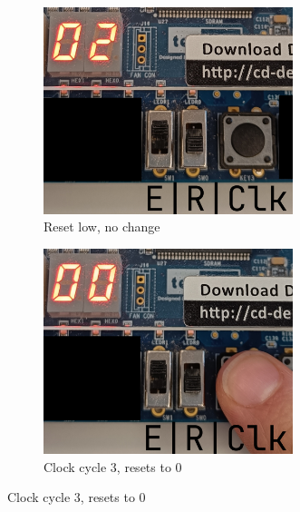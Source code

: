 \documentclass{article}
\begin{document}
\begin{figure}[h]
    \begin{subfigure}[t]{0.45\textwidth}
        \centering
        \includegraphics[width=0.8\textwidth]{Figures/Part1_5.jpg}
        \caption{Reset low, no change}
        \label{fig:p1_5}
    \end{subfigure}
    \hfill
    \begin{subfigure}[t]{0.45\textwidth}
        \centering
        \includegraphics[width=0.8\textwidth]{Figures/Part1_6.jpg}
        \caption{Clock cycle 3, resets to 0}
        \label{fig:p1_6}
    \end{subfigure}


\end{figure}
\end{document}
